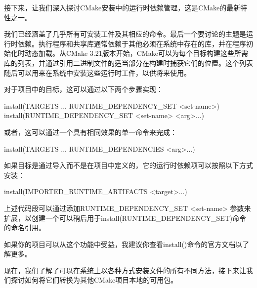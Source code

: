 接下来，让我们深入探讨CMake安装中的运行时依赖管理，这是CMake的最新特性之一。


我们已经涵盖了几乎所有可安装工件及其相应的命令。最后一个要讨论的主题是运行时依赖。执行程序和共享库通常依赖于其他必须在系统中存在的库，并在程序初始化时动态加载。从CMake 3.21版本开始，CMake可以为每个目标构建这些所需库的列表，并通过引用二进制文件的适当部分在构建时捕获它们的位置。这个列表随后可以用来在系统中安装这些运行时工件，以供将来使用。

对于项目中的目标，这可以通过以下两个步骤实现：

\begin{shell}
install(TARGETS ... RUNTIME_DEPENDENCY_SET <set-name>)
install(RUNTIME_DEPENDENCY_SET <set-name> <arg>...)
\end{shell}

或者，这可以通过一个具有相同效果的单一命令来完成：

\begin{shell}
install(TARGETS ... RUNTIME_DEPENDENCIES <arg>...)
\end{shell}

如果目标是通过导入而不是在项目中定义的，它的运行时依赖项可以按照以下方式安装：

\begin{shell}
install(IMPORTED_RUNTIME_ARTIFACTS <target>...)
\end{shell}

上述代码段可以通过添加RUNTIME\_DEPENDENCY\_SET <set-name> 参数来扩展，以创建一个可以稍后用于install(RUNTIME\_DEPENDENCY\_SET)命令的命名引用。

如果你的项目可以从这个功能中受益，我建议你查看install()命令的官方文档以了解更多。

现在，我们了解了可以在系统上以各种方式安装文件的所有不同方法，接下来让我们探讨如何将它们转换为其他CMake项目本地的可用包。











